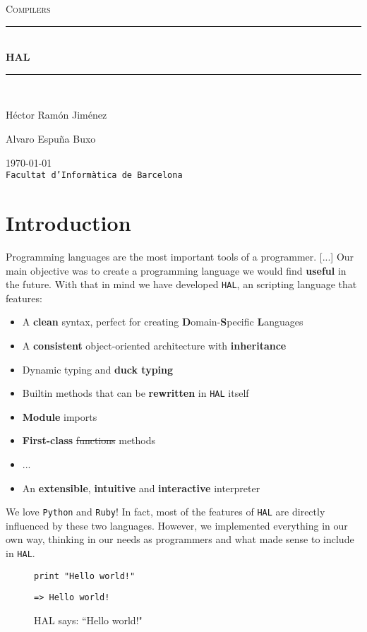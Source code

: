 \documentclass[a4paper,11pt]{article}
\begin{document}
\begin{titlepage}
\begin{center}
\textsc{\Large Compilers}
\\[1.5cm]
\rule{\linewidth}{0.5mm}
\\[0.4cm]
{\huge
\bfseries
HAL
\\[0.4cm]
}
\rule{\linewidth}{0.5mm}
\\[2.5cm]
\begin{minipage}{0.4\textwidth}
\begin{flushleft}
\large
Héctor Ramón Jiménez
\end{flushleft}
\end{minipage}
\begin{minipage}{0.4\textwidth}
\begin{flushright}
\large
Alvaro Espuña Buxo
\end{flushright}
\end{minipage}
\vfill
{\large
\today
}
\\
{\large
\texttt{Facultat d'Informàtica de Barcelona}
}
\end{center}
\end{titlepage}
\tableofcontents
\clearpage
\section{Introduction}
Programming languages are the most important tools of a programmer. [...]
Our main objective was to create a programming language we would find \textbf{useful} in the future.
    With that in mind we have developed \texttt{HAL}, an scripting language that features:
\begin{itemize}
\item
A \textbf{clean} syntax, perfect for creating \textbf{D}omain-\textbf{S}pecific \textbf{L}anguages
\item
A \textbf{consistent} object-oriented architecture with \textbf{inheritance}
\item
Dynamic typing and \textbf{duck typing}
\item
Builtin methods that can be \textbf{rewritten} in \texttt{HAL} itself
\item
\textbf{Module} imports
\item
\textbf{First-class} \st{functions} methods
\item
...
\item
An \textbf{extensible}, \textbf{intuitive} and \textbf{interactive} interpreter
\end{itemize}
We love \texttt{Python} and \texttt{Ruby}! In fact, most of the features of \texttt{HAL} are directly influenced
    by these two languages. However, we implemented everything in our own way, thinking in our
    needs as programmers and what made sense to include in \texttt{HAL}.
\begin{figure}[h!]
\begin{lstlisting}[language=hal]
print "Hello world!"
\end{lstlisting}
\begin{verbatim}
=> Hello world!
\end{verbatim}
\caption{HAL says: ``Hello world!"}
\end{figure}
\clearpage
\end{document}
